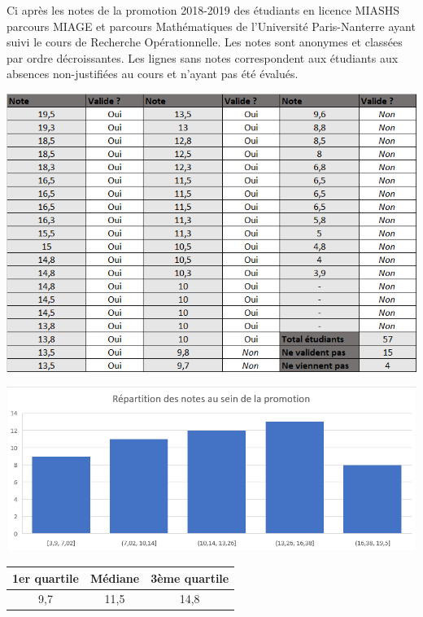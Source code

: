 Ci après les notes de la promotion 2018-2019 des étudiants en licence MIASHS parcours MIAGE et parcours Mathématiques de l'Université Paris-Nanterre ayant suivi le cours de Recherche Opérationnelle. Les notes sont anonymes et classées par ordre décroissantes. Les lignes sans notes correspondent aux étudiants aux absences non-justifiées au cours et n'ayant pas été évalués.

\centerline{\includegraphics[width=\linewidth]{Images/Notes_RO_2018-2019.png}}

\centerline{\includegraphics[width=\linewidth]{Images/Repartition_notes_RO.png}}

\begin{center}
    \begin{tabular}{|c|c|c|}
    \hline
    \textbf{1er quartile} & \textbf{Médiane} & \textbf{3ème quartile} \\ \hline
    9,7                   & 11,5             & 14,8                   \\ \hline
    \end{tabular}
\end{center}

